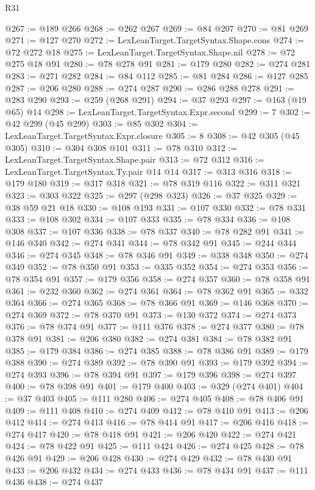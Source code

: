 \begin{lexlean}{R31}
\begin{coremodule}
@267 := @189 @266
@268 := @262 @267
@269 := @84 @207
@270 := @81 @269
@271 := @127 @270
@272 := LexLeanTarget.TargetSyntax.Shape.cons
@274 := @72 @272 @18
@275 := LexLeanTarget.TargetSyntax.Shape.nil
@278 := @72 @275 @18 @91
@280 := @78 @278 @91
@281 := @179 @280
@282 := @274 @281
@283 := @271 @282
@284 := @84 @112
@285 := @81 @284
@286 := @127 @285
@287 := @206 @280
@288 := @274 @287
@290 := @286 @288 @278
@291 := @283 @290
@293 := @259 (@268 @291)
@294 := @37 @293
@297 := @163 (@19 @65) @14
@298 := LexLeanTarget.TargetSyntax.Expr.second
@299 := 7
@302 := @42 @299 (@45 @299)
@303 := @85 @302
@304 := LexLeanTarget.TargetSyntax.Expr.closure
@305 := 8
@308 := @42 @305 (@45 @305)
@310 := @304 @308 @101
@311 := @78 @310
@312 := LexLeanTarget.TargetSyntax.Shape.pair
@313 := @72 @312
@316 := LexLeanTarget.TargetSyntax.Ty.pair @14 @14
@317 := @313 @316
@318 := @179 @180
@319 := @317 @318
@321 := @78 @319 @116
@322 := @311 @321
@323 := @303 @322
@325 := @297 (@298 @323)
@326 := @37 @325
@329 := @38 @59 @21 @18
@330 := @108 @193
@331 := @107 @330
@332 := @78 @331
@333 := @108 @302
@334 := @107 @333
@335 := @78 @334
@336 := @108 @308
@337 := @107 @336
@338 := @78 @337
@340 := @78 @282 @91
@341 := @146 @340
@342 := @274 @341
@344 := @78 @342 @91
@345 := @244 @344
@346 := @274 @345
@348 := @78 @346 @91
@349 := @338 @348
@350 := @274 @349
@352 := @78 @350 @91
@353 := @335 @352
@354 := @274 @353
@356 := @78 @354 @91
@357 := @179 @356
@358 := @274 @357
@360 := @78 @358 @91
@361 := @232 @360
@362 := @274 @361
@364 := @78 @362 @91
@365 := @332 @364
@366 := @274 @365
@368 := @78 @366 @91
@369 := @146 @368
@370 := @274 @369
@372 := @78 @370 @91
@373 := @130 @372
@374 := @274 @373
@376 := @78 @374 @91
@377 := @111 @376
@378 := @274 @377
@380 := @78 @378 @91
@381 := @206 @380
@382 := @274 @381
@384 := @78 @382 @91
@385 := @179 @384
@386 := @274 @385
@388 := @78 @386 @91
@389 := @179 @388
@390 := @274 @389
@392 := @78 @390 @91
@393 := @179 @392
@394 := @274 @393
@396 := @78 @394 @91
@397 := @179 @396
@398 := @274 @397
@400 := @78 @398 @91
@401 := @179 @400
@403 := @329 (@274 @401)
@404 := @37 @403
@405 := @111 @280
@406 := @274 @405
@408 := @78 @406 @91
@409 := @111 @408
@410 := @274 @409
@412 := @78 @410 @91
@413 := @206 @412
@414 := @274 @413
@416 := @78 @414 @91
@417 := @206 @416
@418 := @274 @417
@420 := @78 @418 @91
@421 := @206 @420
@422 := @274 @421
@424 := @78 @422 @91
@425 := @111 @424
@426 := @274 @425
@428 := @78 @426 @91
@429 := @206 @428
@430 := @274 @429
@432 := @78 @430 @91
@433 := @206 @432
@434 := @274 @433
@436 := @78 @434 @91
@437 := @111 @436
@438 := @274 @437

\end{coremodule}
\end{lexlean}
